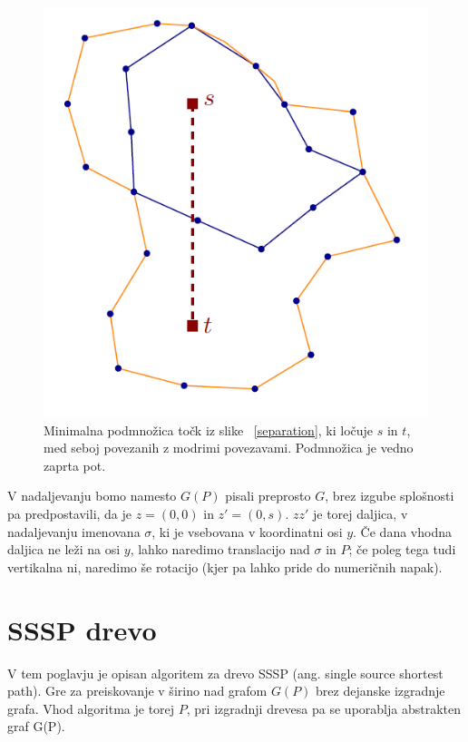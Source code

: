 \documentclass[a4paper, 12pt]{book}
\begin{document}
\begin{figure}
\centerline{\includegraphics[scale=0.6]{pics/walk.png}}
\caption{Minimalna podmnožica točk iz slike ~\ref{separation}, ki ločuje $s$ in $t$, med seboj povezanih z modrimi povezavami. Podmnožica je vedno zaprta pot.}
\label{walk}
\end{figure}

V nadaljevanju bomo namesto $G(P)$ pisali preprosto $G$, brez izgube splošnosti pa predpostavili, da je $z=(0,0)$ in $z'=(0,s)$. $zz'$ je torej daljica, v nadaljevanju imenovana $\sigma$, ki je vsebovana v koordinatni osi $y$. Če dana vhodna daljica ne leži na osi $y$, lahko naredimo translacijo nad $\sigma$ in $P$; če poleg tega tudi vertikalna ni, naredimo še rotacijo (kjer pa lahko pride do numeričnih napak). 
\section{SSSP drevo}

V tem poglavju je opisan algoritem za drevo SSSP (ang. single source shortest path). Gre za preiskovanje v širino nad grafom $G(P)$ brez dejanske izgradnje grafa. Vhod algoritma je torej $P$, pri izgradnji drevesa pa se uporablja abstrakten graf G(P).
\end{document}
